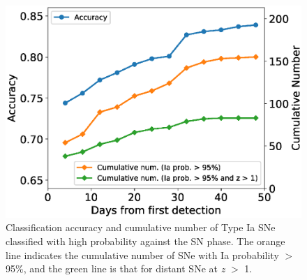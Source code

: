 \documentclass[useamsfonts]{pasj01}
\begin{document}
\begin{figure}[htbp]
  \begin{center}
     \includegraphics[width=\columnwidth]{figures/n_observations_SNphase_v200318.eps}
  \end{center}
  \caption{%
  Classification accuracy and cumulative number of Type Ia SNe classified with high probability against the SN phase.
  The orange line indicates the cumulative number of SNe with Ia probability $>$ 95\%, and the green line is that for distant SNe at {\it z} $>$ 1. %
  }%
  \label{fig:n_observations_SNphase}
\end{figure}
%
\end{document}
